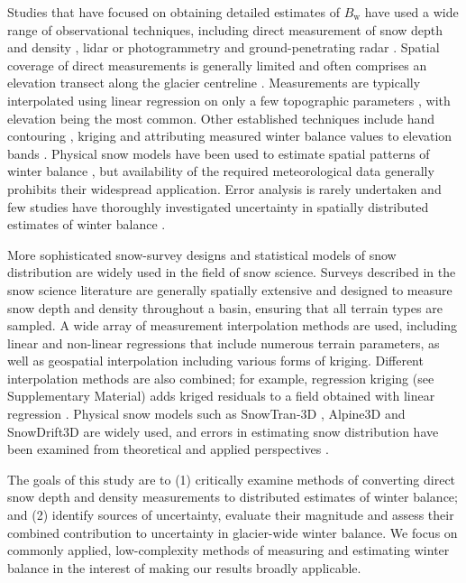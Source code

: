 \documentclass[review,oneside, letterpaper]{igs}
\begin{document}
Studies that have focused on obtaining detailed estimates of $B_\mathrm{w}$ have used a wide range of observational techniques, including direct measurement of snow depth and density \citep[e.g.][]{Cullen2017}, lidar or photogrammetry \citep[e.g.][]{Sold2013} and ground-penetrating radar \citep[e.g.][]{Machguth2006, Gusmeroli2014, McGrath2015}. Spatial coverage of direct measurements is generally limited and often comprises an elevation transect along the glacier centreline \citep[e.g.][]{Kaser2003}. Measurements are typically interpolated using linear regression on only a few topographic parameters \citep[e.g.][]{MacDougall2011}, with elevation being the most common. Other established techniques include hand contouring \citep[e.g.][]{Tangborn1975}, kriging \citep[e.g.][]{Hock1999} and attributing measured winter balance values to elevation bands \citep[e.g.][]{Thibert2008}. Physical snow models have been used to estimate spatial patterns of winter balance \citep[e.g.][]{Mott2008, Schuler2008, Dadic2010}, but availability of the required meteorological data generally prohibits their widespread application. Error analysis is rarely undertaken and few studies have thoroughly investigated uncertainty in spatially distributed estimates of winter balance  \citep[c.f.][]{Schuler2008}. 

More sophisticated snow-survey designs and statistical models of snow distribution are widely used in the field of snow science. Surveys described in the snow science literature are generally spatially extensive and designed to measure snow depth and density throughout a basin, ensuring that all terrain types are sampled. A wide array of measurement interpolation methods are used, including linear \citep[e.g.][]{Lopez2010} and non-linear regressions \citep[e.g.][]{Molotch2005} that include numerous terrain parameters, as well as geospatial interpolation \citep[e.g.][]{Erxleben2002, Cullen2017} including various forms of kriging. Different interpolation methods are also combined; for example, regression kriging (see Supplementary Material) adds kriged residuals to a field obtained with linear regression \citep[e.g.][]{Balk2000}. Physical snow models such as SnowTran-3D \citep{Liston1998}, Alpine3D \citep{Lehning2006} and SnowDrift3D \citep{Schneiderbauer2011} are widely used, and errors in estimating snow distribution have been examined from theoretical \citep[e.g.][]{Trujillo2015} and applied perspectives \citep[e.g.][]{Turcan1975,Woo1978, Deems2006}. 

The goals of this study are to (1) critically examine methods of converting direct snow depth and density measurements to distributed estimates of winter balance; and (2) identify sources of uncertainty, evaluate their magnitude and assess their combined contribution to uncertainty in glacier-wide winter balance. We focus on commonly applied, low-complexity methods of measuring and estimating winter balance in the interest of making our results broadly applicable.
\end{document}

